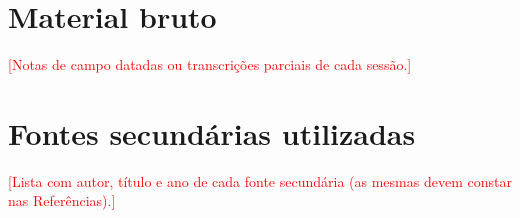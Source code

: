 \documentclass[
  12pt,
  oneside,
  a4paper,
  chapter=TITLE,
  section=TITLE,
  english,
  brazil
]{abntex2}
\newcommand{\preencher}[1]{\textcolor{red}{[#1]}}
\begin{document}
\begin{apendicesenv}
\chapter{Material bruto}\label{ap:material}
\preencher{Notas de campo datadas ou transcrições parciais de cada sessão.}

\chapter{Fontes secundárias utilizadas}\label{ap:fontes}
\preencher{Lista com autor, título e ano de cada fonte secundária (as mesmas
devem constar nas Referências).}

\end{apendicesenv}
\end{document}
